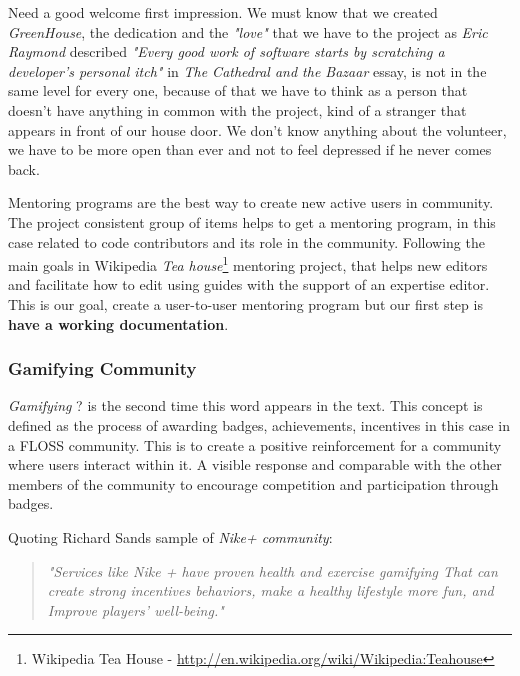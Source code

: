 \documentclass[11pt]{scrartcl}
\begin{document}
\par Need a good welcome first impression. We must know that we created \emph{GreenHouse}, the dedication and the \emph{"love"} that we have to the project as \emph{Eric Raymond} described \emph{"Every good work of software starts by scratching a developer's personal itch"} in \emph{The Cathedral and the Bazaar} essay\cite{cath-bazaar}, is not in the same level for every one, because of that we have to think as a person that doesn't have anything in common with the project, kind of a stranger that appears in front of our house door. We don't know anything about the volunteer, we have to be more open than ever and not to feel depressed if he never comes back.

\par Mentoring programs are the best way to create new active users in community. The project consistent group of items helps to get a mentoring program, in this case related to code contributors and its role in the community. Following the main goals in Wikipedia \emph{Tea house}\footnote{Wikipedia Tea House - \url{http://en.wikipedia.org/wiki/Wikipedia:Teahouse}} mentoring project, that helps new editors and facilitate how to edit using guides with the support of an expertise editor. This is our goal, create a user-to-user mentoring program but our first step is \textbf{have a working documentation}.



\subsubsection{Gamifying Community}
\label{sub:gamifying-community}

\emph{Gamifying} ? is the second time this word appears in the text. This concept is defined as the process of awarding badges, achievements, incentives in this case in a FLOSS community. This is to create a positive reinforcement for a community where users interact within it. A visible response and comparable with the other members of the community to encourage competition and participation through badges.

Quoting Richard Sands sample of \emph{Nike+ community}:

\begin{quotation}
    \begin{center}
        \emph{"Services like Nike + have proven health and exercise gamifying That can create strong incentives behaviors, make a healthy lifestyle more fun, and Improve players' well-being."}
    \end{center}
\end{quotation}
\end{document}
